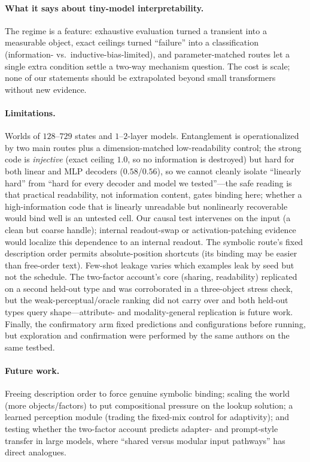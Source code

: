 \documentclass[10pt]{article} %
\begin{document}
\paragraph{What it says about tiny-model interpretability.} The regime is a feature: exhaustive
evaluation turned a transient into a measurable object, exact ceilings turned ``failure'' into a
classification (information- vs.\ inductive-bias-limited), and parameter-matched routes let a
single extra condition settle a two-way mechanism question. The cost is scale; none of our
statements should be extrapolated beyond small transformers without new evidence.

\paragraph{Limitations.} Worlds of $128$--$729$ states and $1$--$2$-layer models. Entanglement is
operationalized by two main routes plus a dimension-matched low-readability control; the strong code is \emph{injective} (exact ceiling $1.0$, so no
information is destroyed) but hard for both linear and MLP decoders ($0.58$/$0.56$), so we cannot
cleanly isolate ``linearly hard'' from ``hard for every decoder and model we tested''---the safe
reading is that practical readability, not information content, gates binding here; whether a
high-information code that is linearly unreadable but nonlinearly recoverable would bind well is an
untested cell. Our causal test intervenes on the input (a clean but coarse handle); internal
readout-swap or activation-patching evidence would localize this dependence to an internal readout. The symbolic
route's fixed description order permits absolute-position shortcuts (its binding may be easier than
free-order text). Few-shot leakage varies which examples leak by seed but not the schedule. The
two-factor account's core (sharing, readability) replicated on a second held-out type and was
corroborated in a three-object stress check, but the weak-perceptual/oracle ranking did not carry over and both held-out
types query shape---attribute- and modality-general replication is future work. Finally, the
confirmatory arm fixed predictions and configurations before running, but exploration and
confirmation were performed by the same authors on the same testbed.

\paragraph{Future work.} Freeing description order to force genuine symbolic binding; scaling the
world (more objects/factors) to put compositional pressure on the lookup solution; a learned
perception module (trading the fixed-mix control for adaptivity); and testing whether the
two-factor account predicts adapter- and prompt-style transfer in large models, where ``shared versus
modular input pathways'' has direct analogues.
\end{document}
